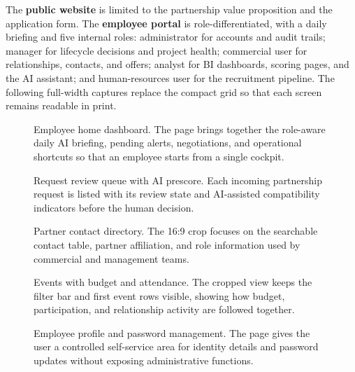The \textbf{public website} is limited to the partnership value proposition and the application form. The \textbf{employee portal} is role-differentiated, with a daily briefing and five internal roles: administrator for accounts and audit trails; manager for lifecycle decisions and project health; commercial user for relationships, contacts, and offers; analyst for BI dashboards, scoring pages, and the AI assistant; and human-resources user for the recruitment pipeline. The following full-width captures replace the compact grid so that each screen remains readable in print.

\begin{figure}[p]
  \centering
  \caption{Employee home dashboard. The page brings together the role-aware daily AI briefing, pending alerts, negotiations, and operational shortcuts so that an employee starts from a single cockpit.}
  \label{fig:employee-home-view}
\end{figure}

\begin{figure}[p]
  \centering
  \caption{Request review queue with AI prescore. Each incoming partnership request is listed with its review state and AI-assisted compatibility indicators before the human decision.}
  \label{fig:employee-request-review-view}
\end{figure}

\begin{figure}[p]
  \centering
  \caption{Partner contact directory. The 16:9 crop focuses on the searchable contact table, partner affiliation, and role information used by commercial and management teams.}
  \label{fig:employee-contact-directory-view}
\end{figure}

\begin{figure}[p]
  \centering
  \caption{Events with budget and attendance. The cropped view keeps the filter bar and first event rows visible, showing how budget, participation, and relationship activity are followed together.}
  \label{fig:employee-events-view}
\end{figure}

\begin{figure}[p]
  \centering
  \caption{Employee profile and password management. The page gives the user a controlled self-service area for identity details and password updates without exposing administrative functions.}
  \label{fig:employee-profile-view}
\end{figure}

